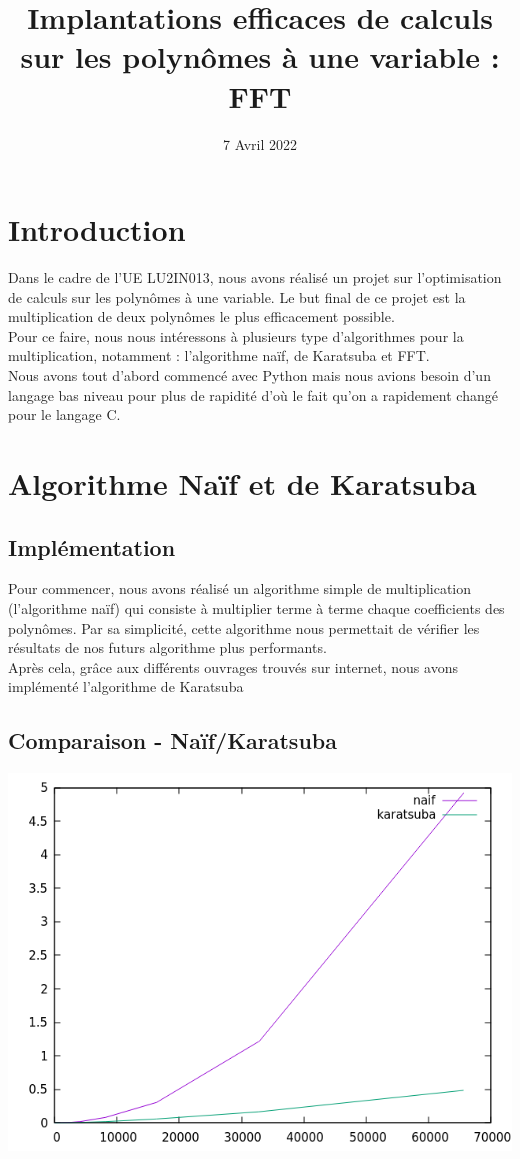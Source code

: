 \documentclass[12pt, a4paper]{report}
\title{Implantations efficaces de calculs sur les polynômes à une variable : FFT}
\author{}
\date{7 Avril 2022}
\begin{document}
\maketitle
\tableofcontents
\newpage

\chapter*{Introduction}
Dans le cadre de l'UE LU2IN013, nous avons réalisé un projet sur l'optimisation de calculs sur les polynômes à une variable. Le but final de ce projet est la multiplication de deux polynômes le plus efficacement possible.\\
Pour ce faire, nous nous intéressons à plusieurs type d'algorithmes pour la multiplication, notamment : l'algorithme naïf, de Karatsuba et FFT.\\
Nous avons tout d'abord commencé avec Python mais nous avions besoin d'un langage bas niveau pour plus de rapidité d'où le fait qu'on a rapidement changé pour le langage C.\\


\chapter{Algorithme Naïf et de Karatsuba}
\section{Implémentation}
Pour commencer, nous avons réalisé un algorithme simple de multiplication (l'algorithme naïf) qui consiste à multiplier terme à terme chaque coefficients des polynômes. Par sa simplicité, cette algorithme nous permettait de vérifier les résultats de nos futurs algorithme plus performants.\\
Après cela, grâce aux différents ouvrages 
trouvés sur internet, nous avons implémenté l'algorithme de Karatsuba 
\section{Comparaison - Naïf/Karatsuba}

\includegraphics[scale=1]{naif_kara}\\
\end{document}
